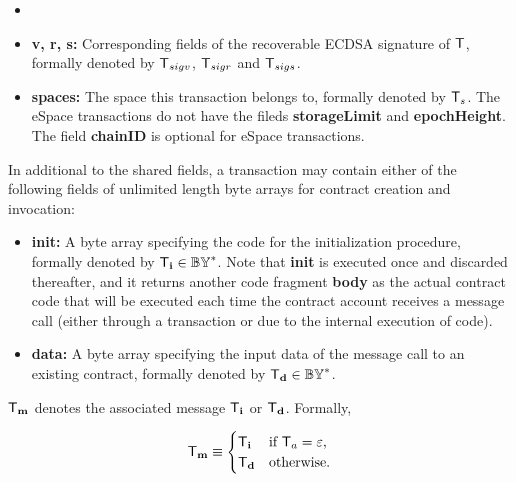 \begin{itemize} [nosep]
	\item {} 

	\item {\bf v, r, s:} Corresponding fields of the recoverable ECDSA signature of $\textsf{T}$, formally denoted by $\textsf{T}_{sigv}$, $\textsf{T}_{sigr}$ and $\textsf{T}_{sigs}$. 
	
	\item {\bf spaces:} The space this transaction belongs to, formally denoted by $\textsf{T}_s$. The eSpace transactions do not have the fileds {\bf storageLimit} and {\bf epochHeight}. The field {\bf chainID} is optional for eSpace transactions. 
\end{itemize}

\smallskip
In additional to the shared fields, 
a transaction may contain either of the following fields of unlimited length byte arrays for contract creation and invocation:
\begin{itemize}[nosep]
 	\item {\bf init:} A byte array specifying the \cvm code for the initialization procedure, formally denoted by $\textsf{T}_{\bf i} \in \mathbb{BY}^*$.
 	Note that {\bf init} is executed once and discarded thereafter, and it returns another code fragment {\bf body} as the actual contract code that will be executed each time the contract account receives a message call (either through a transaction or due to the internal execution of code).


 	\item {\bf data:} A byte array specifying the input data of the message call to an existing contract, formally denoted by $\textsf{T}_{\bf d}\in \mathbb{BY}^*$.
\end{itemize} 

$\textsf{T}_{\bf m}$ denotes the associated message $\textsf{T}_{\bf i}$ or $\textsf{T}_{\bf d}$. Formally, 

\begin{align}
	\textsf{T}_{\bf m}\equiv\begin{cases}
		\textsf{T}_{\bf i} & \mbox{if $\textsf{T}_a=\varepsilon$,}\\
		\textsf{T}_{\bf d} & \mbox{otherwise.}
	\end{cases}
\end{align}


